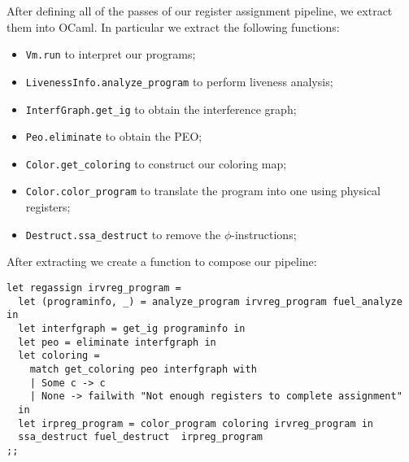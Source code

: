 After defining all of the passes of our register assignment pipeline, we extract them into OCaml.
In particular we extract the following functions:
\begin{itemize}
  \item \texttt{Vm.run} to interpret our programs;
  \item \texttt{LivenessInfo.analyze\_program} to perform liveness analysis;
  \item \texttt{InterfGraph.get\_ig} to obtain the interference graph;
  \item \texttt{Peo.eliminate} to obtain the PEO;
  \item \texttt{Color.get\_coloring} to construct our coloring map;
  \item \texttt{Color.color\_program} to translate the program into one using physical registers;
  \item \texttt{Destruct.ssa\_destruct} to remove the $\phi$-instructions;
\end{itemize}

After extracting we create a function to compose our pipeline:

\begin{lstlisting}[style=OCaml]
let regassign irvreg_program =
  let (programinfo, _) = analyze_program irvreg_program fuel_analyze in
  let interfgraph = get_ig programinfo in
  let peo = eliminate interfgraph in
  let coloring =
    match get_coloring peo interfgraph with
    | Some c -> c
    | None -> failwith "Not enough registers to complete assignment"
  in
  let irpreg_program = color_program coloring irvreg_program in
  ssa_destruct fuel_destruct  irpreg_program
;;
\end{lstlisting}